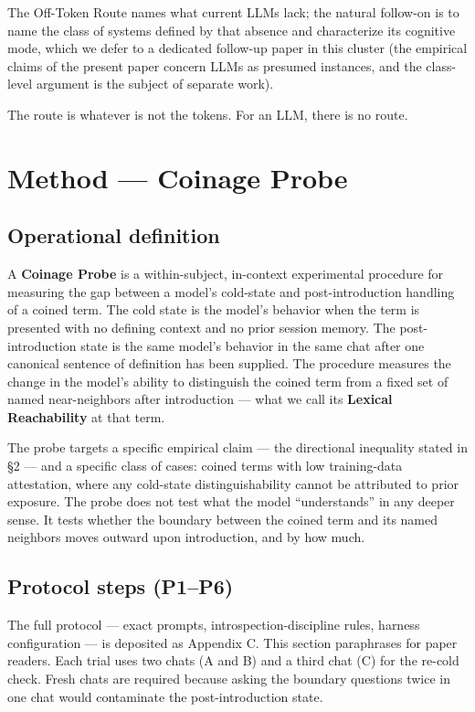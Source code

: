 \documentclass[11pt,a4paper]{article}
\begin{document}
The Off-Token Route names what current LLMs lack; the natural follow-on is to name the class of systems defined by that absence and characterize its cognitive mode, which we defer to a dedicated follow-up paper in this cluster (the empirical claims of the present paper concern LLMs as presumed instances, and the class-level argument is the subject of separate work).

The route is whatever is not the tokens. For an LLM, there is no route.

\section{Method --- Coinage Probe}

\subsection{Operational definition}

A \textbf{Coinage Probe} is a within-subject, in-context experimental procedure for measuring the gap between a model's cold-state and post-introduction handling of a coined term. The cold state is the model's behavior when the term is presented with no defining context and no prior session memory. The post-introduction state is the same model's behavior in the same chat after one canonical sentence of definition has been supplied. The procedure measures the change in the model's ability to distinguish the coined term from a fixed set of named near-neighbors after introduction --- what we call its \textbf{Lexical Reachability} at that term.

The probe targets a specific empirical claim --- the directional inequality stated in \S2 --- and a specific class of cases: coined terms with low training-data attestation, where any cold-state distinguishability cannot be attributed to prior exposure. The probe does not test what the model ``understands'' in any deeper sense. It tests whether the boundary between the coined term and its named neighbors moves outward upon introduction, and by how much.

\subsection{Protocol steps (P1--P6)}

The full protocol --- exact prompts, introspection-discipline rules, harness configuration --- is deposited as Appendix C. This section paraphrases for paper readers. Each trial uses two chats (A and B) and a third chat (C) for the re-cold check. Fresh chats are required because asking the boundary questions twice in one chat would contaminate the post-introduction state.
\end{document}
